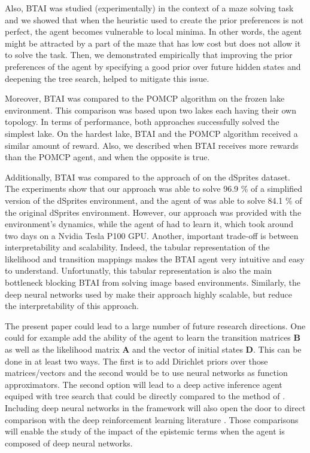 \documentclass[twoside,11pt]{article}
\begin{document}
Also, BTAI was studied (experimentally) in the context of a maze solving task and we showed that when the heuristic used to create the prior preferences is not perfect, the agent becomes vulnerable to local minima. In other words, the agent might be attracted by a part of the maze that has low cost but does not allow it to solve the task. Then, we demonstrated empirically that improving the prior preferences of the agent by specifying a good prior over future hidden states and deepening the tree search, helped to mitigate this issue.

Moreover, BTAI was compared to the POMCP algorithm \citep{POMCP} on the frozen lake environment. This comparison was based upon two lakes each having their own topology. In terms of performance, both approaches successfully solved the simplest lake. On the hardest lake, BTAI and the POMCP algorithm received a similar amount of reward. Also, we described when BTAI receives more rewards than the POMCP agent, and when the opposite is true.

Additionally, BTAI was compared to the approach of \citet{DeepAIwithMCMC} on the dSprites dataset. The experiments show that our approach was able to solve 96.9 \% of a simplified version of the dSprites environment, and the agent of \citet{DeepAIwithMCMC} was able to solve 84.1 \% of the original dSprites environment. However, our approach was provided with the environment's dynamics, while the agent of \citet{DeepAIwithMCMC} had to learn it, which took around two days on a Nvidia Tesla P100 GPU. Another, important trade-off is between interpretability and scalability. Indeed, the tabular representation of the likelihood and transition mappings makes the BTAI agent very intuitive and easy to understand. Unfortunatly, this tabular representation is also the main bottleneck blocking BTAI from solving image based environments. Similarly, the deep neural networks used by \citet{DeepAIwithMCMC} make their approach highly scalable, but reduce the interpretability of this approach.

The present paper could lead to a large number of future research directions. One could for example add the ability of the agent to learn the transition matrices $\bm{B}$ as well as the likelihood matrix $\bm{A}$ and the vector of initial states $\bm{D}$. This can be done in at least two ways. The first is to add Dirichlet priors over those matrices/vectors and the second would be to use neural networks as function approximators. The second option will lead to a deep active inference agent \citep{PixelBasedAI,DeepAI} equiped with tree search that could be directly compared to the method of \citet{DeepAIwithMCMC}. Including deep neural networks in the framework will also open the door to direct comparison with the deep reinforcement learning literature \citep{DBLP:journals/corr/abs-1801-01290,DeepRL,DDQN,lample2016playing,Go}. Those comparisons will enable the study of the impact of the epistemic terms when the agent is composed of deep neural networks.
\end{document}
